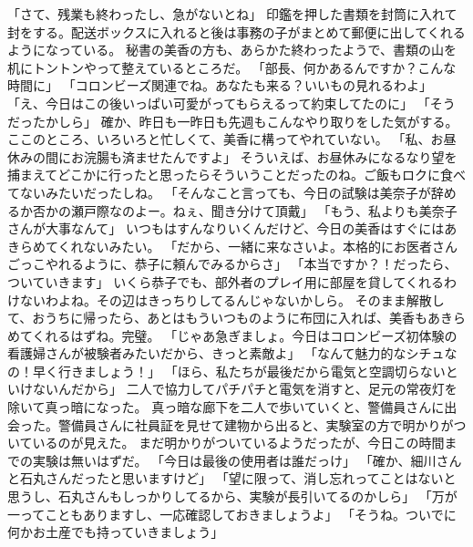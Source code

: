 「さて、残業も終わったし、急がないとね」
印鑑を押した書類を封筒に入れて封をする。配送ボックスに入れると後は事務の子がまとめて郵便に出してくれるようになっている。
秘書の美香の方も、あらかた終わったようで、書類の山を机にトントンやって整えているところだ。
「部長、何かあるんですか？こんな時間に」
「コロンビーズ関連でね。あなたも来る？いいもの見れるわよ」
「え、今日はこの後いっぱい可愛がってもらえるって約束してたのに」
「そうだったかしら」
確か、昨日も一昨日も先週もこんなやり取りをした気がする。ここのところ、いろいろと忙しくて、美香に構ってやれていない。
「私、お昼休みの間にお浣腸も済ませたんですよ」
そういえば、お昼休みになるなり望を捕まえてどこかに行ったと思ったらそういうことだったのね。ご飯もロクに食べてないみたいだったしね。
「そんなこと言っても、今日の試験は美奈子が辞めるか否かの瀬戸際なのよー。ねぇ、聞き分けて頂戴」
「もう、私よりも美奈子さんが大事なんて」
いつもはすんなりいくんだけど、今日の美香はすぐにはあきらめてくれないみたい。
「だから、一緒に来なさいよ。本格的にお医者さんごっこやれるように、恭子に頼んでみるからさ」
「本当ですか？！だったら、ついていきます」
いくら恭子でも、部外者のプレイ用に部屋を貸してくれるわけないわよね。その辺はきっちりしてるんじゃないかしら。
そのまま解散して、おうちに帰ったら、あとはもういつものように布団に入れば、美香もあきらめてくれるはずね。完璧。
「じゃあ急ぎましょ。今日はコロンビーズ初体験の看護婦さんが被験者みたいだから、きっと素敵よ」
「なんて魅力的なシチュなの！早く行きましょう！」
「ほら、私たちが最後だから電気と空調切らないといけないんだから」
二人で協力してパチパチと電気を消すと、足元の常夜灯を除いて真っ暗になった。
真っ暗な廊下を二人で歩いていくと、警備員さんに出会った。警備員さんに社員証を見せて建物から出ると、実験室の方で明かりがついているのが見えた。
まだ明かりがついているようだったが、今日この時間までの実験は無いはずだ。
「今日は最後の使用者は誰だっけ」
「確か、細川さんと石丸さんだったと思いますけど」
「望に限って、消し忘れってことはないと思うし、石丸さんもしっかりしてるから、実験が長引いてるのかしら」
「万が一ってこともありますし、一応確認しておきましょうよ」
「そうね。ついでに何かお土産でも持っていきましょう」


